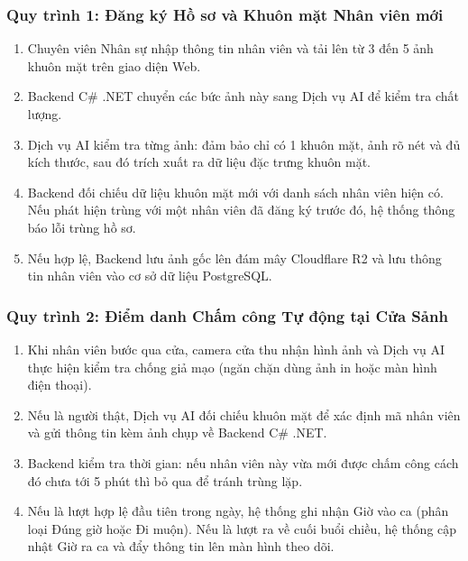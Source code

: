 \documentclass[12pt,a4paper]{article}
\begin{document}
\subsubsection{Quy trình 1: Đăng ký Hồ sơ và Khuôn mặt Nhân viên mới}
\begin{enumerate}[nosep, leftmargin=1.8em]
    \item Chuyên viên Nhân sự nhập thông tin nhân viên và tải lên từ 3 đến 5 ảnh khuôn mặt trên giao diện Web.
    \item Backend C\# .NET chuyển các bức ảnh này sang Dịch vụ AI để kiểm tra chất lượng.
    \item Dịch vụ AI kiểm tra từng ảnh: đảm bảo chỉ có 1 khuôn mặt, ảnh rõ nét và đủ kích thước, sau đó trích xuất ra dữ liệu đặc trưng khuôn mặt.
    \item Backend đối chiếu dữ liệu khuôn mặt mới với danh sách nhân viên hiện có. Nếu phát hiện trùng với một nhân viên đã đăng ký trước đó, hệ thống thông báo lỗi trùng hồ sơ.
    \item Nếu hợp lệ, Backend lưu ảnh gốc lên đám mây Cloudflare R2 và lưu thông tin nhân viên vào cơ sở dữ liệu PostgreSQL.
\end{enumerate}

\subsubsection{Quy trình 2: Điểm danh Chấm công Tự động tại Cửa Sảnh}
\begin{enumerate}[nosep, leftmargin=1.8em]
    \item Khi nhân viên bước qua cửa, camera cửa thu nhận hình ảnh và Dịch vụ AI thực hiện kiểm tra chống giả mạo (ngăn chặn dùng ảnh in hoặc màn hình điện thoại).
    \item Nếu là người thật, Dịch vụ AI đối chiếu khuôn mặt để xác định mã nhân viên và gửi thông tin kèm ảnh chụp về Backend C\# .NET.
    \item Backend kiểm tra thời gian: nếu nhân viên này vừa mới được chấm công cách đó chưa tới 5 phút thì bỏ qua để tránh trùng lặp.
    \item Nếu là lượt hợp lệ đầu tiên trong ngày, hệ thống ghi nhận Giờ vào ca (phân loại Đúng giờ hoặc Đi muộn). Nếu là lượt ra về cuối buổi chiều, hệ thống cập nhật Giờ ra ca và đẩy thông tin lên màn hình theo dõi.
\end{enumerate}
\end{document}
